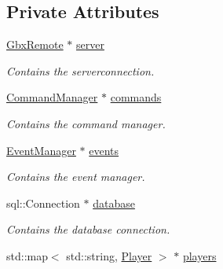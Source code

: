\subsection*{Private Attributes}
\begin{DoxyCompactItemize}
\item 
\hypertarget{classCallBackManager_a27cccc154989a36eb80580f3d9f69c51}{\hyperlink{classGbxRemote}{Gbx\-Remote} $\ast$ \hyperlink{classCallBackManager_a27cccc154989a36eb80580f3d9f69c51}{server}}\label{classCallBackManager_a27cccc154989a36eb80580f3d9f69c51}

\begin{DoxyCompactList}\small\item\em Contains the serverconnection. \end{DoxyCompactList}\item 
\hypertarget{classCallBackManager_a29d2d950b831a6ab7194fa3a6951a5ef}{\hyperlink{classCommandManager}{Command\-Manager} $\ast$ \hyperlink{classCallBackManager_a29d2d950b831a6ab7194fa3a6951a5ef}{commands}}\label{classCallBackManager_a29d2d950b831a6ab7194fa3a6951a5ef}

\begin{DoxyCompactList}\small\item\em Contains the command manager. \end{DoxyCompactList}\item 
\hypertarget{classCallBackManager_a144945c3b30a7946674393b412746f8f}{\hyperlink{classEventManager}{Event\-Manager} $\ast$ \hyperlink{classCallBackManager_a144945c3b30a7946674393b412746f8f}{events}}\label{classCallBackManager_a144945c3b30a7946674393b412746f8f}

\begin{DoxyCompactList}\small\item\em Contains the event manager. \end{DoxyCompactList}\item 
\hypertarget{classCallBackManager_a64e970ca45d503658879c63c5b5297cd}{sql\-::\-Connection $\ast$ \hyperlink{classCallBackManager_a64e970ca45d503658879c63c5b5297cd}{database}}\label{classCallBackManager_a64e970ca45d503658879c63c5b5297cd}

\begin{DoxyCompactList}\small\item\em Contains the database connection. \end{DoxyCompactList}\item 
\hypertarget{classCallBackManager_a26e135142b37e3b02b72aa7a091ef854}{std\-::map$<$ std\-::string, \hyperlink{structPlayer}{Player} $>$ $\ast$ \hyperlink{classCallBackManager_a26e135142b37e3b02b72aa7a091ef854}{players}}\label{classCallBackManager_a26e135142b37e3b02b72aa7a091ef854}


\end{DoxyCompactItemize}

